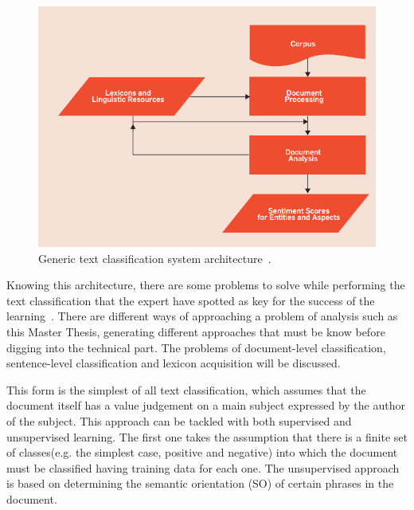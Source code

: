 \begin{figure}[!htp]
    \centering
    \includegraphics[scale=0.85]{img/state-of-art/text-classification-architecture.png}

    \caption{Generic text classification system architecture~\cite{feldman2013techniques}.}
    \label{fig:text-clasification-architecture}
\end{figure}


Knowing this architecture, there are some problems to solve while performing the text classification that the expert have spotted as key for the success of the learning~\cite{feldman2013techniques}. There are different ways of approaching a problem of analysis such as this Master Thesis, generating different approaches that must be know before digging into the technical part. The problems of document-level classification, sentence-level classification and lexicon acquisition will be discussed.

This form is the simplest of all text classification, which assumes that the document itself has a value judgement on a main subject expressed by the author of the subject. This approach can be tackled with both supervised and unsupervised learning. The first one takes the assumption that there is a finite set of classes(e.g. the simplest case, positive and negative) into which the document must be classified having training data for each one. The unsupervised approach is based on determining the semantic orientation (SO) of certain phrases in the document.

